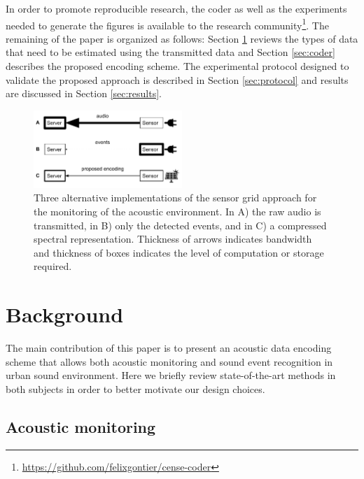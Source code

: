 \documentclass[sensors,article,submit,moreauthors,pdftex,10pt,a4paper]{mdpi}
\begin{document}
In order to promote reproducible research, the coder as well as the experiments needed to generate the figures is available to the research community\footnote{\url{https://github.com/felixgontier/cense-coder}}. The remaining of the paper is organized as follows: Section \ref{sec:background} reviews the types of data that need to be estimated using the transmitted data and Section \ref{sec:coder} describes the proposed encoding scheme. The experimental protocol designed to validate the proposed approach is described in Section \ref{sec:protocol} and results are discussed in Section \ref{sec:results}.

\begin{figure}[h]
\centering
\includegraphics[width=0.5\textwidth]{figures/censeCoder}
\caption{Three alternative implementations of the sensor grid approach for the monitoring of the acoustic environment. In A) the raw audio is transmitted, in B) only the detected events, and in C) a compressed spectral representation. Thickness of arrows indicates bandwidth and thickness of boxes indicates the level of computation or storage required.}
\label{fig:codingScheme}
\end{figure}


\section{Background} \label{sec:background}


The main contribution of this paper is to present an acoustic data encoding scheme that allows both acoustic monitoring and sound event recognition in urban sound environment. Here we briefly review state-of-the-art methods in both subjects in order to better motivate our design choices.

\subsection{Acoustic monitoring}
\end{document}
